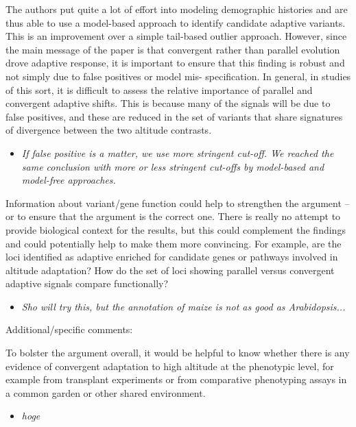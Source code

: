 \documentclass[onecolumn,oneside,letterpaper]{article}
\begin{document}
The authors put quite a lot of effort into modeling demographic histories and are thus able to use a model-based approach to identify candidate adaptive variants.  This is an improvement over a simple tail-based outlier approach.  However, since the main message of the paper is that convergent rather than parallel evolution drove adaptive response, it is important to ensure that this finding is robust and not simply due to false positives or model mis- specification.  In general, in studies of this sort, it is difficult to assess the relative importance of parallel and convergent adaptive shifts. This is because many of the signals will be due to false positives, and these are reduced in the set of variants that share signatures of divergence between the two altitude contrasts.  
\setlength{\parskip}{-5.0pt}
\begin{itemize}
\item \textit{ If false positive is a matter, we use more stringent cut-off.   We reached the same conclusion with more or
 less stringent cut-offs by model-based and model-free approaches.  }
\end{itemize}
\setlength{\parskip}{10.0pt}

Information about variant/gene function could help to strengthen the argument -- or to ensure that the argument is the correct one.  There is really no attempt to provide biological context for the results, but this could complement the findings and could potentially help to make them more convincing.  For example, are the loci identified as adaptive enriched for candidate genes or pathways involved in altitude adaptation? How do the set of loci showing parallel versus convergent adaptive signals compare functionally?   
\setlength{\parskip}{-5.0pt}
\begin{itemize}
\item \textit{ Sho will try this, but the annotation of maize is not as good as Arabidopsis... }
\end{itemize}
\setlength{\parskip}{10.0pt}

Additional/specific comments:  

To bolster the argument overall, it would be helpful to know whether there is any evidence of convergent adaptation to high altitude at the phenotypic level, for example from transplant experiments or from comparative phenotyping assays in a common garden or other shared environment.  
\setlength{\parskip}{-5.0pt}
\begin{itemize}
\item \textit{ hoge }
\end{itemize}
\setlength{\parskip}{10.0pt}
\end{document}
